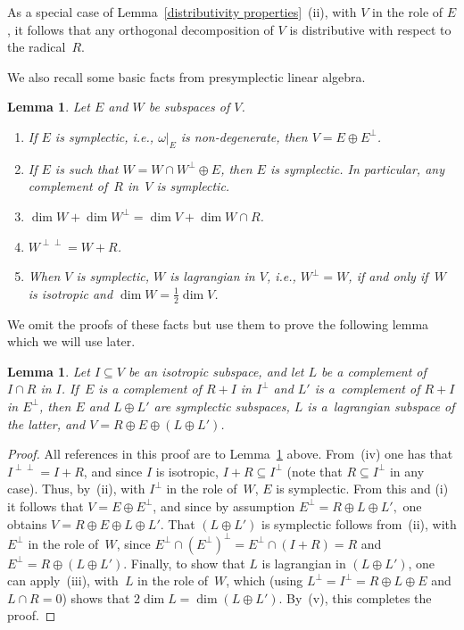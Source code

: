 \documentclass[pdftex]{sigma}
\numberwithin{equation}{section}
\newtheorem{Lemma}[Theorem]{Lemma}
\begin{document}
\begin{Remark}\label{radical distributivity}
As a special case of Lemma~\ref{distributivity properties}~(ii), with $V$ in the role of $E$, it follows that any orthogonal decomposition of $V$ is distributive with respect to the radical~$R$.
\end{Remark}

We also recall some basic facts from presymplectic linear algebra.

\begin{Lemma}\label{linear algebra}
Let $E$ and $W$ be subspaces of $V$.
\begin{enumerate}[{\rm (i)}]\itemsep=0pt
\item If $E$ is symplectic, i.e., $\omega \vert_{E}$ is non-degenerate, then $V = E \oplus E^{\perp}$.
\item If $E$ is such that $W = W \cap W^{\perp} \oplus E$, then $E$ is symplectic. In particular, any complement of~$R$ in~$V$ is symplectic.
\item $\dim W + \dim W^{\perp} =  \dim V + \dim W \cap R$.
\item $W^{\perp \perp} = W + R$.
\item When $V$ is symplectic, $W$ is  {lagrangian} in $V$, i.e., $W^{\perp} = W$, if and only if~$W$ is isotropic and $\dim W = \tfrac{1}{2} \dim V$.
\end{enumerate}
\end{Lemma}

We omit the proofs of these facts but use them to prove the following lemma which we will use later.

\begin{Lemma}\label{reduction}
Let $I \subseteq V$ be an isotropic subspace, and let $L$ be a complement of $I \cap R$ in $I$. If~$E$ is a complement of $R + I$ in $I^{\perp}$ and $L'$ is a~complement of $R + I$ in $E^{\perp}$, then $E$ and $L \oplus L'$ are symplectic subspaces, $L$ is a~lagrangian subspace of the latter, and $V = R \oplus E \oplus (L \oplus L')$.
\end{Lemma}

\begin{proof}
All references in this proof are to Lemma~\ref{linear algebra} above. From~(iv) one has that $I^{\perp \perp} = I + R$, and since $I$ is isotropic, $I + R \subseteq I^{\perp}$ (note that $R \subseteq I^{\perp}$ in any case). Thus, by~(ii), with $I^{\perp}$ in the role of~$W$, $E$ is symplectic. From this and (i) it follows that $V = E \oplus E^{\perp}$, and since by assumption $E^{\perp} = R \oplus L \oplus L',$ one obtains $V = R \oplus E \oplus L \oplus L'$. That $(L \oplus L')$ is symplectic follows from~(ii), with $E^{\perp}$ in the role of~$W$, since $E^{\perp} \cap (E^{\perp})^{\perp} = E^{\perp} \cap (I + R) = R$ and $E^{\perp} = R \oplus (L \oplus L')$. Finally, to show that $L$ is lagrangian in $(L \oplus L')$, one can apply~(iii), with~$L$ in the role of~$W$, which (using $L^{\perp} = I^{\perp} = R \oplus L \oplus E$ and $L \cap R = 0$) shows that $2 \dim L = \dim (L \oplus L')$. By~(v), this completes the proof.
\end{proof}
\end{document}
